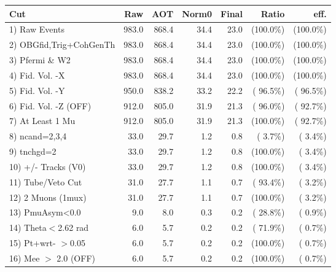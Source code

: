  \begin{table}[h!]\centering
 \begin{tabular}{||l||r|r|r|r|r|r||}
 \hline
 \hline
 Cut & Raw & AOT & Norm0 & Final & Ratio & eff.       \\
 \hline
  1) Raw Events           &        983.0 &        868.4 &         34.4 &         23.0 & (100.0\%) & (100.0\%) \\
  2) OBGfid,Trig+CohGenTh &        983.0 &        868.4 &         34.4 &         23.0 & (100.0\%) & (100.0\%) \\
  3) Pfermi \& W2         &        983.0 &        868.4 &         34.4 &         23.0 & (100.0\%) & (100.0\%) \\
  4) Fid. Vol. -X         &        983.0 &        868.4 &         34.4 &         23.0 & (100.0\%) & (100.0\%) \\
  5) Fid. Vol. -Y         &        950.0 &        838.2 &         33.2 &         22.2 & ( 96.5\%) & ( 96.5\%) \\
  6) Fid. Vol. -Z (OFF)   &        912.0 &        805.0 &         31.9 &         21.3 & ( 96.0\%) & ( 92.7\%) \\
  7) At Least 1 Mu        &        912.0 &        805.0 &         31.9 &         21.3 & (100.0\%) & ( 92.7\%) \\
  8) ncand=2,3,4          &         33.0 &         29.7 &          1.2 &          0.8 & (  3.7\%) & (  3.4\%) \\
  9) tnchgd=2             &         33.0 &         29.7 &          1.2 &          0.8 & (100.0\%) & (  3.4\%) \\
 10) +/- Tracks (V0)      &         33.0 &         29.7 &          1.2 &          0.8 & (100.0\%) & (  3.4\%) \\
 11) Tube/Veto Cut        &         31.0 &         27.7 &          1.1 &          0.7 & ( 93.4\%) & (  3.2\%) \\
 12) 2 Muons (1mux)       &         31.0 &         27.7 &          1.1 &          0.7 & (100.0\%) & (  3.2\%) \\
 13) PmuAsym<0.0          &          9.0 &          8.0 &          0.3 &          0.2 & ( 28.8\%) & (  0.9\%) \\
 14) Theta$<$2.62 rad     &          6.0 &          5.7 &          0.2 &          0.2 & ( 71.9\%) & (  0.7\%) \\
 15) Pt+wrt- $>$0.05      &          6.0 &          5.7 &          0.2 &          0.2 & (100.0\%) & (  0.7\%) \\
 16) Mee $>$ 2.0  (OFF)   &          6.0 &          5.7 &          0.2 &          0.2 & (100.0\%) & (  0.7\%) \\

\end{tabular}
\end{table}
